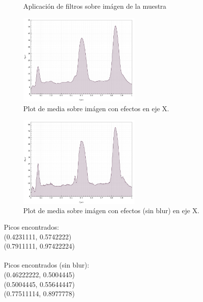 \begin{itemize}
\begin{figure}[H]
	\caption{Aplicaci\'on de filtros sobre im\'agen de la muestra}
	\centering
	\end{figure}
	\begin{figure}[H]
	  \vspace{-0.2cm}
	  \centering
	  \includegraphics[width=230px]{imagenes-jtlc/experimento/search-peaks/2/plot-x}
	  \centering
	  \vspace{-0.4cm}
	  \caption{Plot de media sobre im\'agen con efectos en eje X.}
	  \label{fig:sp-2-plot-x}
	  \vspace{-0.15cm}
	\end{figure}
	\begin{figure}[H]
	  \vspace{-0.2cm}
	  \centering
	  \includegraphics[width=230px]{imagenes-jtlc/experimento/search-peaks/2/plot-x-no-blur}
	  \centering
	  \vspace{-0.4cm}
	  \caption{Plot de media sobre im\'agen con efectos (sin blur) en eje X.}
	  \label{fig:sp-2-plot-x-no-blur}
	  \vspace{-0.15cm}
	\end{figure}
	Picos encontrados: \\
	(0.4231111, 0.5742222)\\
	(0.7911111, 0.97422224)\\ \\
	Picos encontrados (sin blur):\\
	(0.46222222, 0.5004445)\\
	(0.5004445, 0.55644447)\\
	(0.77511114, 0.8977778)\\
	

\end{itemize}
